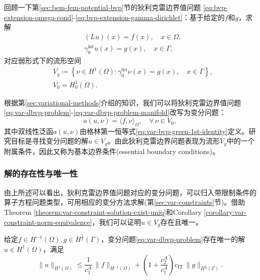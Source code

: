 回顾一下第\ref{sec:bem-fem-potential-bvp}节的狄利克雷边界值问题
\eqref{eq:bvp-extension-omega-cond}-\eqref{eq:bvp-extension-gamma-dirichlet}：基于给定的$f$和$g$，求解
\begin{equation}
  \label{eq:var-dbvp-problem}
  \begin{split}
    &(L u)(x) = f(x), \quad x \in \Omega, \\
    &\gamma_0^{\text{int}} u(x) = g(x), \quad x \in \Gamma,
  \end{split}
\end{equation}
对应弱形式下的流形空间
\begin{equation}
  \label{eq:var-dbvp-problem-manifold}
\begin{split}
  &V_g \coloneqq
  \left\{
  \nu \in H^{1}(\Omega): \gamma_0^{\text{int}} \nu(x) = g(x), \quad x \in \Gamma
  \right\},\\
  &V_0 = H_{0}^{1}(\Omega).
\end{split}
\end{equation}

根据第\ref{sec:variational-methods}介绍的知识，我们可以将狄利克雷边界值问题\eqref{eq:var-dbvp-problem}-\eqref{eq:var-dbvp-problem-manifold}改写为变分问题：
\begin{equation}
  \label{eq:var-dbvp-variational-problem}
  a(u,\nu) = \langle f, \nu \rangle_{\Omega}, \quad \forall \, \nu \in V_0,
\end{equation}
其中双线性泛函$a(u,\nu)$由格林第一恒等式\eqref{eq:var-bvp-green-1st-identity}定义。研究目标是寻找变分问题的解$u \in V_g$。由此狄利克雷边界问题表现为流形$V_g$中的一个附属条件，因此又称为基本边界条件(essential boundary conditions)。

\subsubsection{解的存在性与唯一性}
由上所述可以看出，狄利克雷边界值问题对应的变分问题，可以归入带限制条件的算子方程问题类型，可用相应的变分方法求解(第\eqref{sec:var-constraints}节)。借助Theorem \ref{theorem:var-constraint-solution-exist-uniq}和Corollary \ref{corollary:var-constraint-norm-equivalence}，我们可以证明$u \in V_g$存在且唯一。

\begin{theorem}[狄利克雷边界值问题的弱形式解]
  \label{theorem:var-dvbp-uniq-exist-solution}
  给定$f \in H^{-1}(\Omega), g \in H^{\frac{1}{2}}(\Gamma)$，变分问题\eqref{eq:var-dbvp-problem}存在唯一的解$u \in H^{1}(\Omega)$，满足
  \begin{equation}
    \label{eq:var-dvbp-uniq-exist-solution}
    \big\| u \big\|_{H^{1}(\Omega)} \le \frac{1}{c_1^A} \, \big\| f \big\|_{H^{-1}(\Omega)} + \left( 1 + \frac{c_2^A}{c_1^A} \right) c_{\text{IT}} \, \big\| g \big\|_{H^{\frac{1}{2}}(\Gamma)}.
  \end{equation}
\end{theorem}

